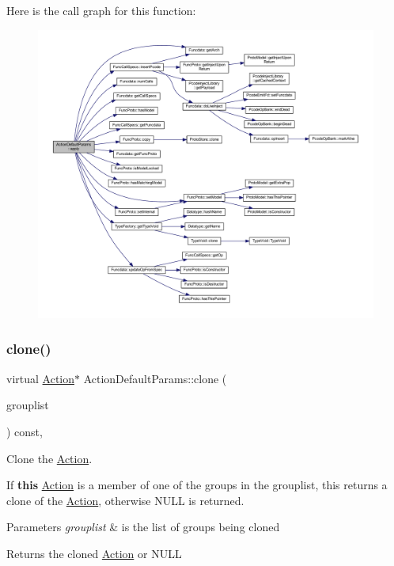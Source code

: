 Here is the call graph for this function\+:
\nopagebreak
\begin{figure}[H]
\begin{center}
\leavevmode
\includegraphics[width=350pt]{class_action_default_params_a32f4c196d02d9f86c66749b9bf5d2247_cgraph}
\end{center}
\end{figure}
\mbox{\label{class_action_default_params_ab1eaa217e71047b924bf0decd2f067a1}} 
\subsubsection{\texorpdfstring{clone()}{clone()}}
{\footnotesize\ttfamily virtual \mbox{\hyperlink{class_action}{Action}}$\ast$ Action\+Default\+Params\+::clone (\begin{DoxyParamCaption}\item[{const \mbox{\hyperlink{class_action_group_list}{Action\+Group\+List}} \&}]{grouplist }\end{DoxyParamCaption}) const\hspace{0.3cm}{\ttfamily [inline]}, {\ttfamily [virtual]}}



Clone the \mbox{\hyperlink{class_action}{Action}}. 

If {\bfseries{this}} \mbox{\hyperlink{class_action}{Action}} is a member of one of the groups in the grouplist, this returns a clone of the \mbox{\hyperlink{class_action}{Action}}, otherwise N\+U\+LL is returned. 
\begin{DoxyParams}{Parameters}
{\em grouplist} & is the list of groups being cloned \\
\hline
\end{DoxyParams}
\begin{DoxyReturn}{Returns}
the cloned \mbox{\hyperlink{class_action}{Action}} or N\+U\+LL 
\end{DoxyReturn}


